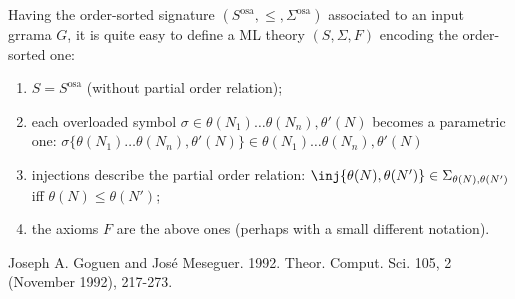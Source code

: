 \documentclass{article}
\theoremstyle{definition}
\theoremstyle{definition}
\theoremstyle{definition}
\theoremstyle{theorem}
\theoremstyle{theorem}
\theoremstyle{theorem}
\begin{document}
{Having the order-sorted signature $(S^\textrm{osa},\le, \Sigma^\textrm{osa})$ associated to an input grrama $G$, it is quite easy to define a ML theory $(S,\Sigma, F)$ encoding the order-sorted one:
\begin{enumerate}
\item $S=S^\textrm{osa}$ (without partial order relation);
\item each overloaded symbol $\sigma\in \theta(N_1)\ldots\theta(N_n), \theta'(N)$ becomes a parametric one: $\sigma\{\theta(N_1)\ldots\theta(N_n), \theta'(N)\}\in \theta(N_1)\ldots\theta(N_n), \theta'(N)$
\item injections describe the partial order relation: $\inj\{\theta(N),\theta(N')\}\in\Sigma_{\theta(N),\theta(N')}$ iff $\theta(N)\le \theta(N')$;
\item the axioms $F$ are the above ones (perhaps with a small different notation).
\end{enumerate}
}

\begin{thebibliography}{ABC99a}

Joseph A. Goguen and José Meseguer. 1992.
\newblock Theor. Comput. Sci. 105, 2 (November 1992), 217-273.

\end{thebibliography}
\end{document}

